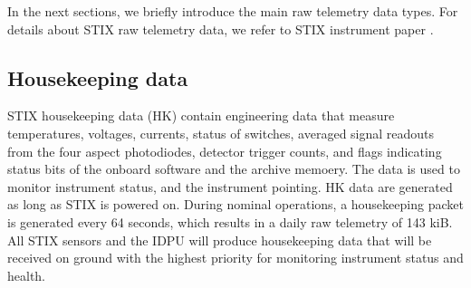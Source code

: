 \documentclass{aa}
\begin{document}
In the next sections, we briefly introduce the main raw telemetry data types.
For details about STIX raw telemetry data, we refer to STIX instrument paper \cite{StixInstrument}.

\subsection{Housekeeping data}
STIX housekeeping data (HK) contain engineering data that measure temperatures, voltages, currents, status of switches,
averaged signal readouts from the four aspect photodiodes, detector trigger counts, and  flags indicating
status bits of the onboard software and the archive memoery.
The data is used to monitor instrument status, and the instrument pointing.
HK data are generated as long as STIX is powered on.
During nominal operations, a housekeeping packet is generated every 64 seconds, which results in a daily raw telemetry of  143 kiB.
All STIX sensors and the IDPU will produce housekeeping data that will be received on ground with the highest priority
for monitoring instrument status and health.
\end{document}
